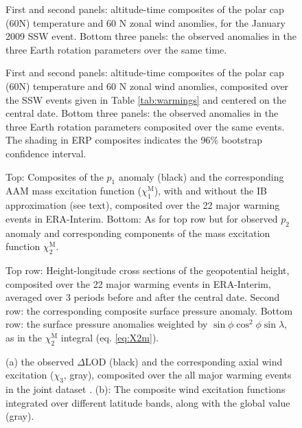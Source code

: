 \documentclass[draft,jgrga]{agutex}
\begin{document}
\begin{figure} 
   \caption{First and second panels: altitude-time composites of the polar cap (60\degree N) temperature and 60 \degree N zonal wind anomlies, for the January 2009 SSW event.  Bottom three panels: the observed anomalies in the three Earth rotation parameters over the same time. }  
   \label{fig:2009event}
 \end{figure}


\begin{figure} 
   \caption{First and second panels: altitude-time composites of the polar cap (60\degree N) temperature and 60 \degree N zonal wind anomlies, composited over the SSW events given in Table \ref{tab:warmings} and centered on the central date.  Bottom three panels: the observed anomalies in the three Earth rotation parameters composited over the same events.  The shading in ERP composites indicates the 96$\%$ bootstrap confidence interval.}
   \label{fig:summary}
 \end{figure}

\begin{figure}
  \noindent
   \caption{Top: Composites of the $p_1$ anomaly (black) and the corresponding AAM mass excitation function  ($\chi_1^{\text{M}}$), with and without the IB approximation (see text), composited over  {the 22 major warming events in ERA-Interim}.   Bottom: As for top row but for observed $p_2$ anomaly and corresponding components of the mass excitation function $\chi_2^{\text{M}}$.}
   \label{fig:composites_X12}
 \end{figure}


\begin{figure}
  \noindent
   \caption{Top row: Height-longitude cross sections of the geopotential height, composited over  {the 22 major warming events in ERA-Interim},  averaged over 3 periods before and after the central date.  Second row: the corresponding composite surface pressure anomaly.   {Bottom row}: the surface pressure anomalies weighted by  $\sin \phi \cos^2 \phi \sin \lambda$, as in the $\chi_2^{\text{M}}$ integral (eq. \ref{eq:X2m}).
}
   \label{fig:EGPH_mass_aam}
 \end{figure}

 
\begin{figure}
  \noindent
   \caption{ (a) the observed $\Delta$LOD (black) and the corresponding axial wind excitation ($\chi_3$, gray), composited over  {the all major warming events in the joint dataset} . (b): The composite wind excitation functions integrated over different latitude bands, along with the global value (gray). }
   \label{fig:composites_X3}
 \end{figure}
\end{document}
